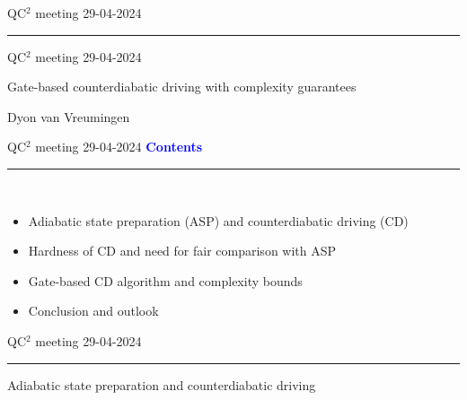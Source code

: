 \documentclass{beamer}
\def\lbt{\small QC$^2$ meeting 29-04-2024} %
\newenvironment{dia}[2]
{
	\begin{frame}
	\vspace{1mm}
	{\small #1}
	\hfill
    {\small\bf\textcolor{blue}{#2}}
	\vspace{3mm}
	\hrule
	\bigskip
}
{
	\vfill
	\end{frame}
}
\begin{document}
\setlength{\abovedisplayskip}{3mm}
\setlength{\belowdisplayskip}{3mm}
\setlength{\abovedisplayshortskip}{3mm}
\setlength{\belowdisplayshortskip}{3mm}

\begin{dia}{\lbt}{}
\vspace*{0.5cm}
\begin{center}
\begin{large}
QC$^2$ meeting 29-04-2024 \\[1.25cm]
\end{large}
\begin{LARGE}
\textcolor{mygreen}{Gate-based counterdiabatic driving with complexity guarantees} \\[1.25cm]
\end{LARGE}
Dyon van Vreumingen
\end{center}
\end{dia}

\begin{dia}{\lbt}{Contents}
$ $\\
\begin{itemize}
    \setlength{\itemsep}{3mm}
    \item Adiabatic state preparation (ASP) and counterdiabatic driving (CD) \pause
    \item Hardness of CD and need for fair comparison with ASP \pause
    \item Gate-based CD algorithm and complexity bounds \pause
    \item Conclusion and outlook
\end{itemize}
\vspace{2.4cm}
\end{dia}

\begin{dia}{\lbt}{}
\vspace{2.5cm}
\begin{center}
\begin{LARGE}
\textcolor{mygreen}{Adiabatic state preparation and counterdiabatic driving}
\end{LARGE}
\end{center}
\vspace*{1.5cm}
\end{dia}
\end{document}
